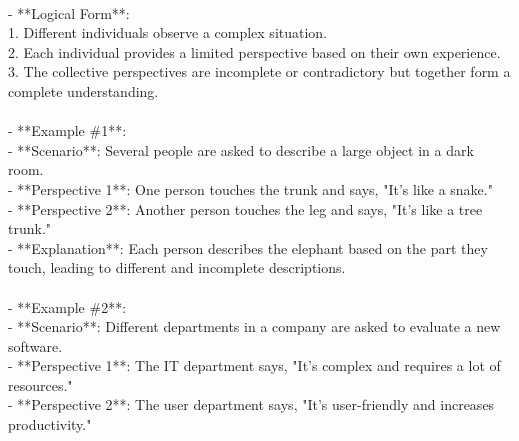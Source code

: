 \documentclass[a4paper,12pt,single,pdftex]{scrbook}
\begin{document}
    
      
    \\

    
      - **Logical Form**:
    \\

    
        1. Different individuals observe a complex situation.
    \\

    
        2. Each individual provides a limited perspective based on their own experience.
    \\

    
        3. The collective perspectives are incomplete or contradictory but together form a complete understanding.
    \\

    
      
    \\

    
      - **Example \#1**:
    \\

    
        - **Scenario**: Several people are asked to describe a large object in a dark room.
    \\

    
        - **Perspective 1**: One person touches the trunk and says, "It's like a snake."
    \\

    
        - **Perspective 2**: Another person touches the leg and says, "It's like a tree trunk."
    \\

    
        - **Explanation**: Each person describes the elephant based on the part they touch, leading to different and incomplete descriptions.
    \\

    
      
    \\

    
      - **Example \#2**:
    \\

    
        - **Scenario**: Different departments in a company are asked to evaluate a new software.
    \\

    
        - **Perspective 1**: The IT department says, "It's complex and requires a lot of resources."
    \\

    
        - **Perspective 2**: The user department says, "It's user-friendly and increases productivity."
    \\
\end{document}
